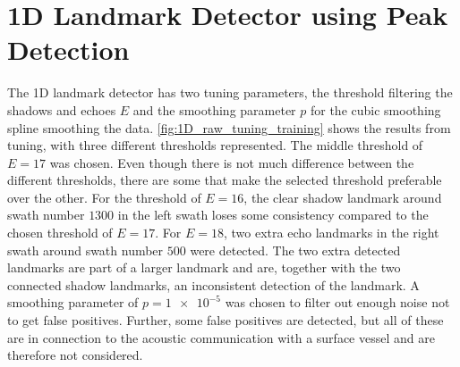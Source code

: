 \section{1D Landmark Detector using Peak Detection}

The 1D landmark detector has two tuning parameters, the threshold filtering the shadows and echoes $E$ and the smoothing parameter $p$ for the cubic smoothing spline smoothing the data. \cref{fig:1D_raw_tuning_training} shows the results from tuning, with three different thresholds represented. The middle threshold of $E = 17$ was chosen. Even though there is not much difference between the different thresholds, there are some that make the selected threshold preferable over the other. For the threshold of $E = 16$, the clear shadow landmark around swath number $1300$ in the left swath loses some consistency compared to the chosen threshold of $E = 17$. For $E = 18$, two extra echo landmarks in the right swath around swath number $500$ were detected. The two extra detected landmarks are part of a larger landmark and are, together with the two connected shadow landmarks, an inconsistent detection of the landmark. A smoothing parameter of $p = \num{1e-5}$ was chosen to filter out enough noise not to get false positives. Further, some false positives are detected, but all of these are in connection to the acoustic communication with a surface vessel and are therefore not considered. 


